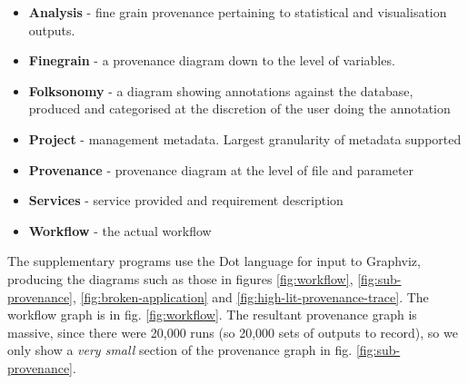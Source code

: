 \documentclass[runningheads]{llncs}
\begin{document}
\begin{itemize} \item \textbf{Analysis} - fine grain provenance pertaining to
            statistical and visualisation outputs.

        \item \textbf{Finegrain} - a provenance diagram down to the level of
        variables.  \item \textbf{Folksonomy} - a diagram showing annotations
            against the database, produced and categorised at the discretion of
            the user doing the annotation \item \textbf{Project} - management
            metadata. Largest granularity of metadata supported \item
            \textbf{Provenance} - provenance diagram at the level of file and
        parameter \item \textbf{Services} - service provided and requirement
            description \item \textbf{Workflow} - the actual workflow
\end{itemize}

The supplementary programs use the Dot language for input to Graphviz\cite{ellson2002graphviz}, producing the diagrams such as those in figures
\ref{fig:workflow}, \ref{fig:sub-provenance}, \ref{fig:broken-application} and
\ref{fig:high-lit-provenance-trace}. The workflow graph is in
fig. \ref{fig:workflow}. The resultant provenance graph is massive, since there were 20,000 runs (so 20,000 sets of outputs to record), so we only show a \textit{very small} section of the provenance graph in fig.
\ref{fig:sub-provenance}. 
\end{document}
